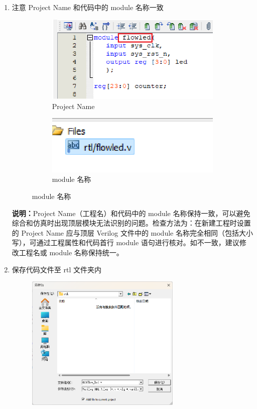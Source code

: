 \documentclass[UTF8]{article}
\theoremstyle{MyLineTheoremStyle} %
\theoremstyle{MyBlockTheoremStyle} %
\theoremstyle{MySubsubsectionStyle} %
\begin{document}
\begin{enumerate}
    \item 注意 Project Name 和代码中的 module 名称一致
    \begin{figure}[H]
        \centering
        \begin{subfigure}{0.5\textwidth}
            \centering
            \includegraphics[width=\linewidth]{step4.png}
            \caption{Project Name}
            \label{fig:step4}
        \end{subfigure}
        \hfill
        \begin{subfigure}{0.45\textwidth}
            \centering
            \includegraphics[width=\linewidth]{step4_2.png}
            \caption{module 名称}
            \label{fig:step4_2}
        \end{subfigure}
    \end{figure}
    \textbf{说明：}Project Name（工程名）和代码中的 module 名称保持一致，可以避免综合和仿真时出现顶层模块无法识别的问题。检查方法为：在新建工程时设置的 Project Name 应与顶层 Verilog 文件中的 module 名称完全相同（包括大小写），可通过工程属性和代码首行 module 语句进行核对。如不一致，建议修改工程名或 module 名称保持统一。
\cleardoublepage
    \item 保存代码文件至 rtl 文件夹内
    \begin{figure}[H]
        \centering
        \includegraphics[width=0.7\textwidth]{step5.png}

\end{figure}
\end{enumerate}
\end{document}
